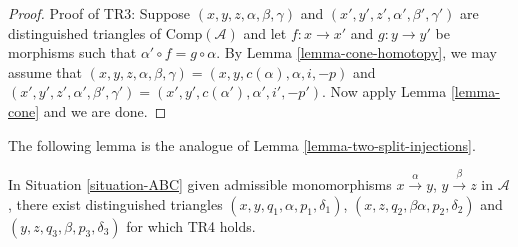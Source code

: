 \begin{proof}
\medskip\noindent
Proof of TR3: Suppose $(x,y,z, \alpha,\beta,\gamma)$ and
$(x',y',z',\alpha',\beta',\gamma')$ are distinguished triangles
of $\text{Comp}(\mathcal{A})$ and let $f: x \to x'$ and
$g: y \to y'$ be morphisms such that
$\alpha' \circ f = g \circ \alpha$. By
Lemma \ref{lemma-cone-homotopy}, we may assume that
$(x,y,z,\alpha,\beta,\gamma)= (x,y,c(\alpha),\alpha, i, -p)$
and $(x',y',z', \alpha',\beta',\gamma')= (x',y',c(\alpha'), \alpha',i',-p')$.
Now apply Lemma \ref{lemma-cone}
and we are done.
\end{proof}

\noindent
The following lemma is the analogue of Lemma \ref{lemma-two-split-injections}.

\begin{lemma}
\label{lemma-dgc-analogue-tr4}
In Situation \ref{situation-ABC} given admissible monomorphisms
$x \xrightarrow{\alpha} y$, $y \xrightarrow{\beta} z$ in $\mathcal{A}$,
there exist distinguished triangles
$(x,y,q_1,\alpha,p_1,\delta_1)$, $(x,z,q_2,\beta\alpha,p_2,\delta_2)$
and $(y,z,q_3,\beta,p_3,\delta_3)$ for which TR4 holds.
\end{lemma}

